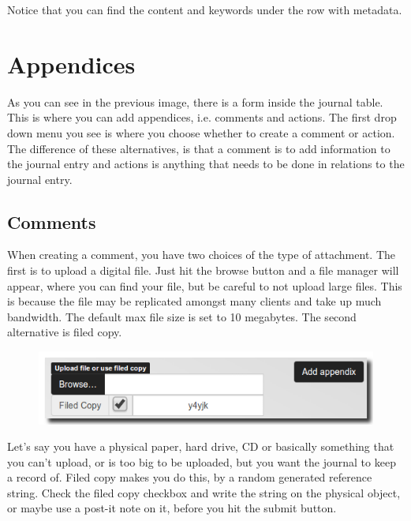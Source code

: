 \documentclass[letterpaper,10pt,english]{sphinxmanual}
\begin{document}
Notice that you can find the content and keywords under the row with metadata.


\section{Appendices}
\label{User manual:appendices}
As you can see in the previous image, there is a form inside the journal table. This is where you can add appendices, i.e. comments and actions. The first drop down menu you see is where
you choose whether to create a comment or action. The difference of these alternatives, is that a comment is to add information to the journal entry and actions is anything that needs to be done in relations to the journal entry.


\subsection{Comments}
\label{User manual:comments}
When creating a comment, you have two choices of the type of attachment. The first is to upload a digital file. Just hit the browse button and a file manager will appear, where you can find your file, but be careful to not upload large files. This is because the file may be replicated amongst many clients and take up much bandwidth. The default max file size is set to 10 megabytes. The second alternative is filed copy.
\begin{figure}[htbp]
\centering

\includegraphics{filed_copy.png}
\end{figure}

Let's say you have a physical paper, hard drive, CD or basically something that you can't upload, or is too big to be uploaded, but you want the journal to keep a record of. Filed copy makes you do this, by a random generated reference string. Check the filed copy checkbox and write the string on the physical object, or maybe use a post-it note on it, before you hit the submit button.
\end{document}
